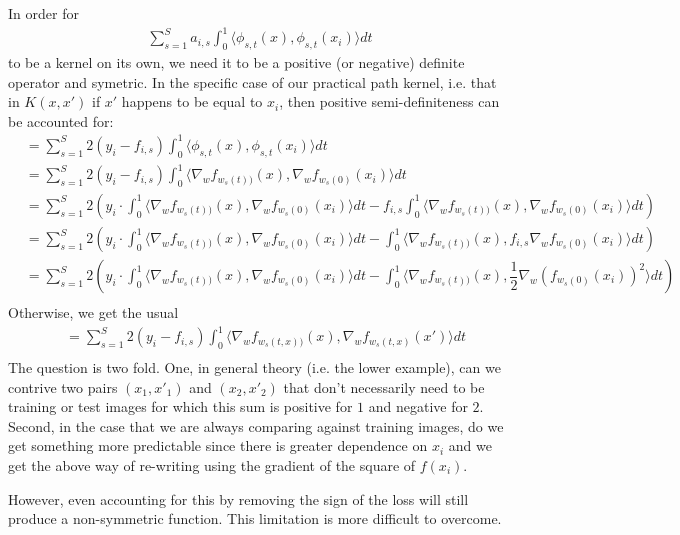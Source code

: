 In order for 
\begin{align}
    \sum_{s=1}^S a_{i,s} \int_0^1 \langle \phi_{s,t}(x), \phi_{s,t}(x_i)\rangle dt
\end{align}
to be a kernel on its own, we need it to be a positive (or negative) definite operator and symetric. In the specific case of our practical path kernel, i.e. that in $K(x,x')$ if $x'$ happens to be equal to $x_i$, then positive semi-definiteness can be accounted for:
\begin{align}
    &= \sum_{s=1}^S 2(y_i- f_{i, s}) \int_0^1 \langle \phi_{s,t}(x), \phi_{s,t}(x_i)\rangle dt\\
    &= \sum_{s=1}^S 2(y_i- f_{i, s}) \int_0^1 \langle \nabla_w f_{w_s(t))} (x), \nabla_w f_{w_s(0)} (x_i)\rangle dt\\
    &= \sum_{s=1}^S 2 \left(y_i \cdot \int_0^1 \langle \nabla_w f_{w_s(t))} (x), \nabla_w f_{w_s(0)} (x_i)\rangle dt - f_{i, s} \int_0^1 \langle \nabla_w f_{w_s(t))} (x), \nabla_w f_{w_s(0)} (x_i)\rangle dt \right)\\
    &= \sum_{s=1}^S 2 \left(y_i \cdot \int_0^1 \langle \nabla_w f_{w_s(t))} (x), \nabla_w f_{w_s(0)} (x_i)\rangle dt -  \int_0^1 \langle \nabla_w f_{w_s(t))} (x), f_{i, s} \nabla_w f_{w_s(0)} (x_i)\rangle dt \right)\\
    &= \sum_{s=1}^S 2 \left(y_i \cdot \int_0^1 \langle \nabla_w f_{w_s(t))} (x), \nabla_w f_{w_s(0)} (x_i)\rangle dt -  \int_0^1 \langle \nabla_w f_{w_s(t))} (x), \dfrac{1}{2}\nabla_w (f_{w_s(0)} (x_i))^2\rangle dt \right)\\
\end{align}
Otherwise, we get the usual 
\begin{align}
        &= \sum_{s=1}^S 2(y_i- f_{i, s}) \int_0^1 \langle \nabla_w f_{w_s(t,x))} (x), \nabla_w f_{w_s(t,x)} (x')\rangle dt\\
\end{align}
The question is two fold. One, in general theory (i.e. the lower example), can we contrive two pairs $(x_1,x'_1)$ and $(x_2,x'_2)$ that don't necessarily need to be training or test images for which this sum is positive for $1$ and negative for $2$. Second, in the case that we are always comparing against training images, do we get something more predictable since there is greater dependence on $x_i$ and we get the above way of re-writing  using the gradient of the square of $f(x_i)$. 

However, even accounting for this by removing the sign of the loss will still produce a non-symmetric function. This limitation is more difficult to overcome.


